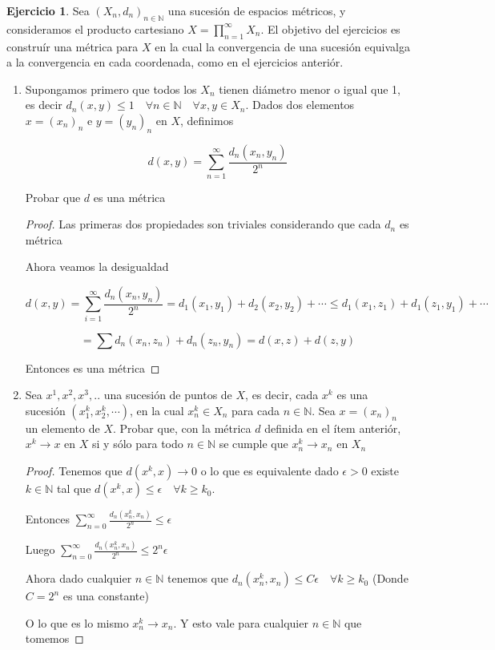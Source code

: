 \documentclass[12pt]{report}
\newcommand{\N}{\mathbb{N}}
\newcommand{\ra}{\rightarrow}
\theoremstyle{definition}
\newtheorem{ej}{Ejercicio}
\begin{document}
\begin{ej}
	Sea $(X_n,d_n)_{n \in \N}$ una sucesión de espacios métricos, y consideramos el producto cartesiano $X = \prod_{n =1}^{\infty} X_n$. El objetivo del ejercicios es construír una métrica para $X$ en la cual la convergencia de una sucesión equivalga a la convergencia en cada coordenada, como en el ejercicios anteriór.
	\begin{enumerate}
		\item Supongamos primero que todos los $X_n$ tienen diámetro menor o igual que 1, es decir $d_n(x,y) \leq 1 \quad \forall n\in \N \quad \forall x,y \in X_n$. Dados dos elementos $x = (x_n)_n$ e $y= (y_n)_n$ en $X$, definimos 

			$$ d(x,y) = \sum_{n = 1}^{\infty} \frac{d_n(x_n,y_n)}{2^n}$$

			Probar que $d$ es una métrica
			\begin{proof}
				Las primeras dos propiedades son triviales considerando que cada $d_n$ es métrica

				Ahora veamos la desigualdad

				$$ d(x,y) = \sum_{i = 1}^\infty \frac{d_n(x_n,y_n)}{2^n} = d_1(x_1,y_1) + d_2(x_2,y_2) + \cdots  \leq d_1(x_1,z_1) + d_1(z_1,y_1) + \cdots $$ 

				$$= \sum d_n(x_n,z_n) + d_n(z_n,y_n) = d(x,z) + d(z,y) $$

				Entonces es una métrica
			\end{proof}
		\item Sea $x^1,x^2,x^3,..$ una sucesión de puntos de $X$, es decir, cada $x^k$ es una sucesión $(x_1^k,x_2^k,\cdots)$, en la cual $x_n^k \in X_n$ para cada $n \in \N$. Sea $x = (x_n)_n$ un elemento de $X$. Probar que, con la métrica $d$ definida en el ítem anteriór, $x^k \ra x $ en $X$ si y sólo para todo $n \in \N$ se cumple que $x_n^k \ra x_n $ en $X_n$	
			
			\begin{proof}
				Tenemos que $d(x^k, x) \ra 0$ o lo que es equivalente dado  $\epsilon > 0 $ existe $k \in \N$ tal que  $d(x^k,x) \leq \epsilon \quad \forall k\geq k_0$. 

			Entonces $\sum_{n = 0}^{\infty} \frac{d_n(x_n^k , x_n)}{2^n} \leq \epsilon $

			Luego  $\sum_{n = 0}^{\infty} \frac{d_n(x_n^k , x_n)}{2^n} \leq 2^n\epsilon $ 

			Ahora dado cualquier $n \in \N$ tenemos que $d_n(x_n^k , x_n) \leq C \epsilon \quad \forall k \geq k_0$ (Donde $C = 2^n$ es una constante)

			O lo que es lo mismo $x_n^k \ra x_n$. Y esto vale para cualquier $n \in \N$ que tomemos
			\end{proof}
			
			
	\end{enumerate}
\end{ej}
\end{document}

